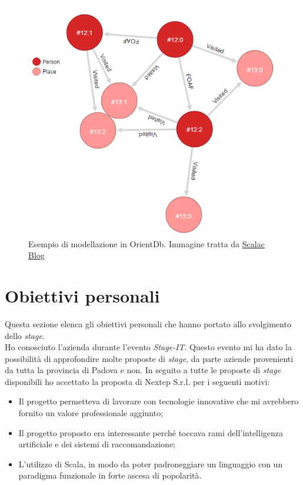 \begin{figure}[ht]
\centering
\includegraphics[scale=0.60]{immagini/graph_orientdb}
\caption{Esempio di modellazione in OrientDb. Immagine tratta da \href{http://blog.scalac.io/2015/11/26/orientdb-and-scala-part1.html}{Scalac Blog}}
\label{fig:orientdb-graph}
\end{figure}




\section{Obiettivi personali}
Questa sezione elenca gli obiettivi personali che hanno portato allo svolgimento dello \emph{stage}.\\Ho conosciuto l'azienda durante l'evento \emph{Stage-IT}. Questo evento mi ha dato la possibilità di approfondire molte proposte di \emph{stage}, da parte aziende provenienti da tutta la provincia di Padova e non. In seguito a tutte le proposte di \emph{stage} disponibili ho accettato la proposta di Nextep S.r.l. per i seguenti motivi:
\begin{itemize}
\item Il progetto permetteva di lavorare con tecnologie innovative che mi avrebbero fornito un valore professionale aggiunto;
\item Il progetto proposto era interessante perché toccava rami dell'intelligenza artificiale e dei sistemi di raccomandazione;
\item L'utilizzo di Scala, in modo da poter padroneggiare un linguaggio con un paradigma funzionale in forte ascesa di popolarità.
\end{itemize}
